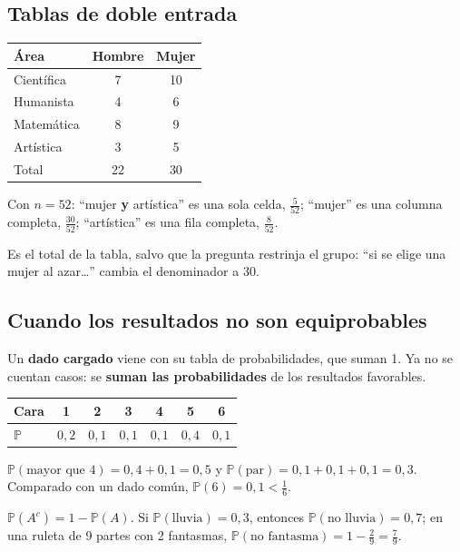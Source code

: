 \subsection{Tablas de doble entrada}
\begin{minipage}[t]{0.38\linewidth}\vspace{0pt}\centering\small
\begin{tabular}{@{}lcc@{}}\toprule
Área & Hombre & Mujer\\\midrule
Científica & 7 & 10\\ Humanista & 4 & 6\\ Matemática & 8 & 9\\ Artística & 3 & 5\\\midrule
Total & 22 & 30\\\bottomrule
\end{tabular}
\end{minipage}\hfill
\begin{minipage}[t]{0.58\linewidth}\vspace{0pt}
Con $n = 52$: ``mujer \textbf{y} artística'' es una sola celda, $\frac{5}{52}$; ``mujer'' es una columna completa, $\frac{30}{52}$; ``artística'' es una fila completa, $\frac{8}{52}$.
\end{minipage}
\begin{clave}[El denominador] Es el total de la tabla, salvo que la pregunta restrinja el grupo: ``si se elige una mujer al azar\dots'' cambia el denominador a 30.\end{clave}

\subsection{Cuando los resultados no son equiprobables}
Un \textbf{dado cargado} viene con su tabla de probabilidades, que suman 1. Ya no se cuentan casos: se \textbf{suman las probabilidades} de los resultados favorables.
\begin{center}\small
\begin{tabular}{@{}l*{6}{c}@{}}\toprule
Cara & 1 & 2 & 3 & 4 & 5 & 6\\\midrule
$\mathbb{P}$ & $0{,}2$ & $0{,}1$ & $0{,}1$ & $0{,}1$ & $0{,}4$ & $0{,}1$\\\bottomrule
\end{tabular}
\end{center}
\begin{ejemplo} $\mathbb{P}(\text{mayor que } 4) = 0{,}4 + 0{,}1 = 0{,}5$ y $\mathbb{P}(\text{par}) = 0{,}1 + 0{,}1 + 0{,}1 = 0{,}3$. Comparado con un dado común, $\mathbb{P}(6) = 0{,}1 < \frac16$.\end{ejemplo}
\begin{clave}[Complemento] $\mathbb{P}(A^c) = 1 - \mathbb{P}(A)$. Si $\mathbb{P}(\text{lluvia}) = 0{,}3$, entonces $\mathbb{P}(\text{no lluvia}) = 0{,}7$; en una ruleta de 9 partes con 2 fantasmas, $\mathbb{P}(\text{no fantasma}) = 1 - \frac29 = \frac79$.\end{clave}


